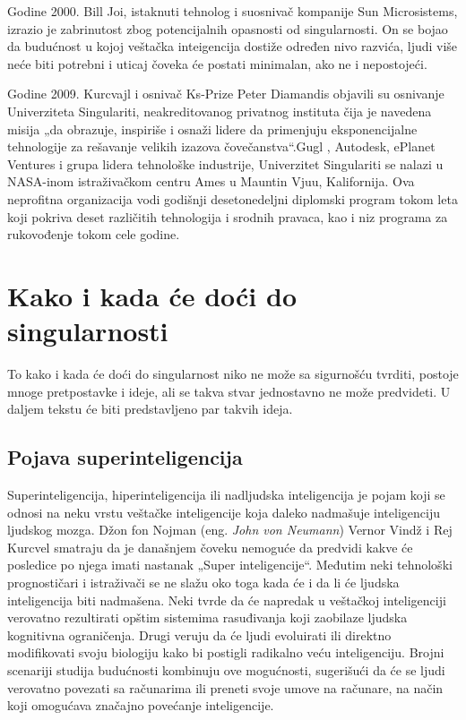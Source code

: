 \documentclass[a4paper]{article}
\begin{document}
Godine 2000. Bill Joi, istaknuti tehnolog i suosnivač kompanije Sun Microsistems, izrazio je zabrinutost zbog potencijalnih opasnosti od singularnosti. On se bojao da budućnost u kojoj veštačka inteigencija dostiže određen nivo razvića, ljudi više neće biti potrebni i uticaj čoveka će postati minimalan, ako ne i nepostojeći.

Godine 2009. Kurcvajl i osnivač Ks-Prize Peter Diamandis objavili su osnivanje Univerziteta Singulariti, neakreditovanog privatnog instituta čija je navedena misija „da obrazuje, inspiriše i osnaži lidere da primenjuju eksponencijalne tehnologije za rešavanje velikih izazova čovečanstva“.Gugl , Autodesk, ePlanet Ventures i grupa lidera tehnološke industrije, Univerzitet Singulariti se nalazi u NASA-inom istraživačkom centru Ames u Mauntin Vjuu, Kalifornija. Ova neprofitna organizacija vodi godišnji desetonedeljni diplomski program tokom leta koji pokriva deset različitih tehnologija i srodnih pravaca, kao i niz programa za rukovođenje tokom cele godine\cite{ref6}.




\section{Kako i kada će doći do singularnosti}	
\label{sec:kakoikada}
To kako i kada će doći do singularnost niko ne može sa sigurnošću tvrditi, postoje mnoge pretpostavke i ideje, ali se takva stvar jednostavno ne može predvideti. U daljem tekstu će biti predstavljeno par takvih ideja.
\subsection{Pojava superinteligencija}

Superinteligencija, hiperinteligencija ili nadljudska inteligencija je pojam koji se odnosi na neku vrstu veštačke inteligencije koja daleko nadmašuje inteligenciju ljudskog mozga. Džon fon Nojman (eng. \textit{John von Neumann}) Vernor Vindž i Rej Kurcvel smatraju da je današnjem čoveku nemoguće da predvidi kakve će posledice po njega imati nastanak „Super inteligencije“.
Međutim neki tehnološki prognostičari i istraživači se ne slažu oko toga kada će i da li će ljudska inteligencija biti nadmašena.  Neki tvrde da će napredak u veštačkoj inteligenciji verovatno rezultirati opštim sistemima rasuđivanja koji zaobilaze ljudska kognitivna ograničenja. Drugi veruju da će ljudi evoluirati ili direktno modifikovati svoju biologiju kako bi postigli radikalno veću inteligenciju\cite{ref7}.
Brojni scenariji studija budućnosti kombinuju ove mogućnosti, sugerišući da će se ljudi verovatno povezati sa računarima ili preneti svoje umove na računare, na način koji omogućava značajno povećanje inteligencije.
\end{document}
